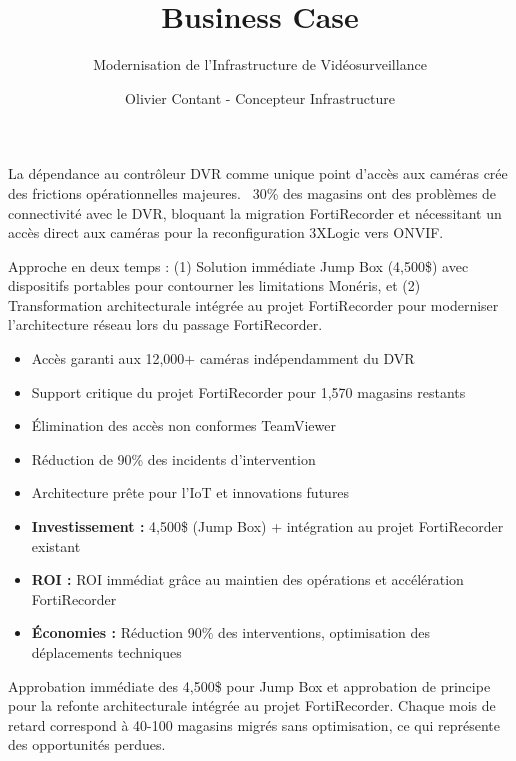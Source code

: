 \documentclass{dollarama}
\title{Business Case}
\subtitle{Modernisation de l'Infrastructure de Vidéosurveillance}
\author{Olivier Contant - Concepteur Infrastructure}
\begin{document}
\maketitle

\tableofcontents
\clearpage


\begin{executivesummaryenv}
\vspace{0.3em}
La dépendance au contrôleur DVR comme unique point d'accès aux caméras crée des frictions opérationnelles majeures. ~30\% des magasins ont des problèmes de connectivité avec le DVR, bloquant la migration FortiRecorder et nécessitant un accès direct aux caméras pour la reconfiguration 3XLogic vers ONVIF.

\vspace{1.2em}
\vspace{0.3em}
Approche en deux temps : (1) Solution immédiate Jump Box (4,500\$) avec dispositifs portables pour contourner les limitations Monéris, et (2) Transformation architecturale intégrée au projet FortiRecorder pour moderniser l'architecture réseau lors du passage FortiRecorder.

\vspace{1.2em}
\vspace{-1em}
\begin{itemize}
\item Accès garanti aux 12,000+ caméras indépendamment du DVR
\item Support critique du projet FortiRecorder pour 1,570 magasins restants
\item Élimination des accès non conformes TeamViewer
\item Réduction de 90\% des incidents d'intervention
\item Architecture prête pour l'IoT et innovations futures
\end{itemize}

\vspace{0.8em}
\vspace{-1em}
\begin{itemize}
\item \textbf{Investissement :} 4,500\$ (Jump Box) + intégration au projet FortiRecorder existant
\item \textbf{ROI :} ROI immédiat grâce au maintien des opérations et accélération FortiRecorder
\item \textbf{Économies :} Réduction 90\% des interventions, optimisation des déplacements techniques
\end{itemize}

\vspace{0.8em}
Approbation immédiate des 4,500\$ pour Jump Box et approbation de principe pour la refonte architecturale intégrée au projet FortiRecorder. Chaque mois de retard correspond à 40-100 magasins migrés sans optimisation, ce qui représente des opportunités perdues.
\end{executivesummaryenv}
\end{document}
